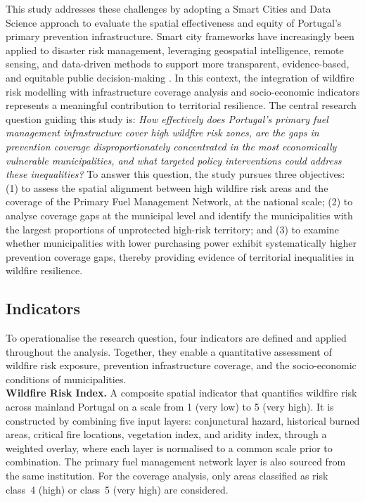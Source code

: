 This study addresses these challenges by adopting a Smart Cities and Data Science
approach to evaluate the spatial effectiveness and equity of Portugal's primary
prevention infrastructure. Smart city frameworks have increasingly been applied to
disaster risk management, leveraging geospatial intelligence, remote sensing, and
data-driven methods to support more transparent, evidence-based, and equitable public
decision-making \cite{IoTSmartCities2024}. In this context, the integration of
wildfire risk modelling with infrastructure coverage analysis and socio-economic
indicators represents a meaningful contribution to territorial resilience. The central
research question guiding this study is: \textit{How effectively does Portugal's
primary fuel management infrastructure cover high wildfire risk zones, are the gaps
in prevention coverage disproportionately concentrated in the most economically
vulnerable municipalities, and what targeted policy interventions could address these
inequalities?} To answer this question, the study pursues three objectives: (1) to
assess the spatial alignment between high wildfire risk areas and the coverage of the
Primary Fuel Management Network, at the national scale; (2) to analyse coverage gaps at the municipal level and
identify the municipalities with the largest proportions of unprotected high-risk
territory; and (3) to examine whether municipalities with lower purchasing power
exhibit systematically higher prevention coverage gaps, thereby providing evidence of
territorial inequalities in wildfire resilience.\\

\subsection{Indicators}



To operationalise the research question, four indicators are defined and applied
throughout the analysis. Together, they enable a quantitative assessment of wildfire
risk exposure, prevention infrastructure coverage, and the socio-economic conditions
of municipalities.\\


\textbf{Wildfire Risk Index.} A composite spatial indicator that quantifies wildfire
risk across mainland Portugal on a scale from 1 (very low) to 5 (very high). It
is constructed by combining five input layers: conjunctural hazard, historical
burned areas, critical fire locations, vegetation index, and aridity index,
through a weighted overlay, where each layer is normalised to a common scale prior
to combination. The primary fuel management network layer is also sourced from the
same institution. For the coverage
analysis, only areas classified as risk class~4 (high) or class~5 (very high)
are considered.\\

